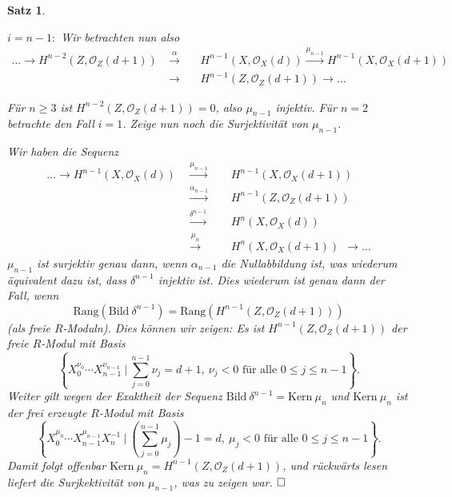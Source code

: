 \documentclass[11pt]{book}
\newtheorem{theorem}{Satz}[section]
\theoremstyle{nonumberbreak}
\newenvironment{pr}[1][]{\ifthenelse{\equal{#1}{}}{\proof}{\proof[#1]}\rm}{\endproof}
\newcommand{\bild}{\mathrm{Bild}\ }
\newcommand{\kernel}{\mathrm{Kern}\ }
\begin{document}
\begin{spacing}{1.4}
\begin{theorem}
\begin{pr}
\begin{compactenum}
\begin{compactenum}
\begin{compactenum}
\item[$i=n-1:$] Wir betrachten nun also 
\setlength{\abovedisplayskip}{5.5pt}
\setlength{\belowdisplayskip}{5.5pt}
\begin{alignat*}{5}
\ldots \rightarrow H^{n-2}(Z, \mathcal{O}_{Z}(d+1)) \ &\overset{\alpha}{\rightarrow} && \  H^{n-1}(X, \mathcal{O}_X(d)) \overset{\mu_{n-1}}{\rightarrow} H^{n-1}(X, \mathcal{O}_X(d+1))\\
& \rightarrow&& \ H^{n-1}(Z, \mathcal{O}_{Z}(d+1)) \rightarrow \ldots
\end{alignat*}

Für $n\geqslant 3$ ist $H^{n-2}(Z, \mathcal{O}_{Z}(d+1))=0$, also $\mu_{n-1}$ injektiv. Für $n=2$ betrachte den Fall $i=1$. Zeige nun noch die Surjektivität von $\mu_{n-1}$.

Wir haben die Sequenz
\setlength{\abovedisplayskip}{5.5pt}
\setlength{\belowdisplayskip}{5.5pt}
\begin{alignat*}{5}
\ldots \rightarrow H^{n-1}(X, \mathcal{O}_X(d)) \ \ &\overset{\mu_{n-1}}{\longrightarrow}&& \ \ H^{n-1}(X, \mathcal{O}_X(d+1)) \\
&\overset{\alpha_{n-1}}{\longrightarrow}&& \ \ H^{n-1}(Z, \mathcal{O}_{Z}(d+1))\\
& \overset{\delta^{n-1}}{\longrightarrow}&& \ \ H^{n}(X, \mathcal{O}_X(d)) \\
& \overset{\mu_{n}}{\longrightarrow}&&\ \ H^{n}(X, \mathcal{O}_X(d+1)) \ \ \longrightarrow \ldots 
\end{alignat*}
$\mu_{n-1}$ ist surjektiv genau dann, wenn $\alpha_{n-1}$ die Nullabbildung ist, was wiederum äquivalent dazu ist, dass $\delta^{n-1}$ injektiv ist. Dies wiederum ist genau dann der Fall, wenn 
$$\mathrm{Rang}\left( \bild \delta^{n-1}\right) = \mathrm{Rang } \left( H^{n-1}(Z, \mathcal{O}_Z(d+1))\right)$$
(als freie $R$-Moduln). Dies können wir zeigen: Es ist $H^{n-1}(Z, \mathcal{O}_Z(d+1))$ der freie $R$-Modul mit Basis 
$$ \left\{ X_0^{\nu_0} \cdots X_{n-1}^{\nu_{n-1}} \ \bigg \vert \ \sum_{j=0}^{n-1} \nu_j = d+1, \ \nu_j <0 \textrm{ für alle } 0 \leqslant j \leqslant n-1 \right\}.$$
Weiter gilt wegen der Exaktheit der Sequenz $\bild \delta^{n-1} = \kernel \mu_n$ und $\kernel \mu_n$ ist der frei erzeugte $R$-Modul mit Basis
$$\left\{ X_0^{\mu_0} \cdots X_{n-1}^{\mu_{n-1}} X_n^{-1} \ \bigg\vert \ \left(\sum_{j=0}^{n-1}\mu_j \right) -1 = d, \ \mu_j < 0 \textrm{ für alle } 0 \leqslant j \leqslant n-1 \right\}.$$
Damit folgt offenbar $\kernel \mu_n = H^{n-1}(Z, \mathcal{O}_Z(d+1))$, und rückwärts lesen liefert die Surjkektivität von $\mu_{n-1}$, was zu zeigen war. $\hfill \Box$




\end{compactenum}
\end{compactenum}
\end{compactenum}
\end{pr}
\end{theorem}
\end{spacing}
\end{document}
